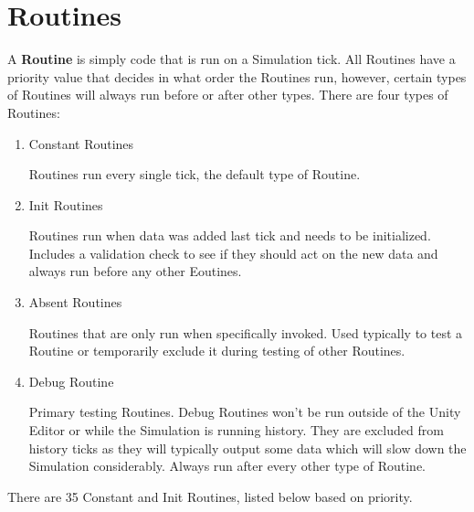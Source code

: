 \documentclass{report}
\begin{document}
\section{Routines}

A \textbf{Routine} is simply code that is run on a Simulation tick. All Routines have a priority value that decides in what order the Routines run, however, certain types of Routines will always run before or after other types. There are four types of Routines:

\begin{enumerate}
        \item Constant Routines

Routines run every single tick, the default type of Routine.

        \item Init Routines

Routines run when data was added last tick and needs to be initialized. Includes a validation check to see if they should act on the new data and always run before any other Eoutines.

        \item Absent Routines

Routines that are only run when specifically invoked. Used typically to test a Routine or temporarily exclude it during testing of other Routines.

        \item Debug Routine

Primary testing Routines. Debug Routines won't be run outside of the Unity Editor or while the Simulation is running history. They are excluded from history ticks as they will typically output some data which will slow down the Simulation considerably. Always run after every other type of Routine.

\end{enumerate}

There are 35 Constant and Init Routines, listed below based on priority.
\end{document}
